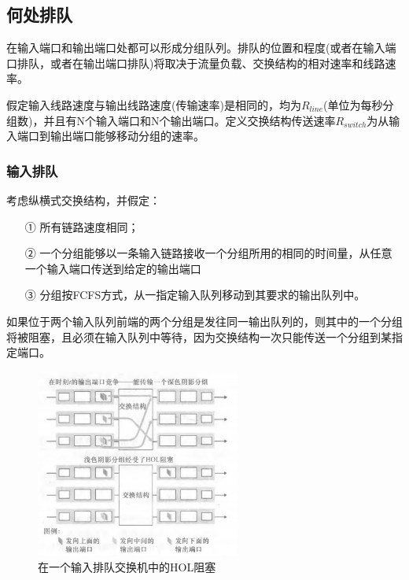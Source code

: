\subsection{何处排队}

    在输入端口和输出端口处都可以形成分组队列。排队的位置和程度(或者在输入端口排队，或者在输岀端口排队)将取决于流量负载、交换结构的相对速率和线路速率。

    假定输入线路速度与输出线路速度(传输速率)是相同的，均为$R_{line}$(单位为每秒分组数)，并且有N个输入端口和N个输出端口。定义交换结构传送速率$R_{switch}$为从输入端口到输出端口能够移动分组的速率。

\subsubsection{输入排队}

    考虑纵横式交换结构，并假定：
    
\begin{itemize}
    \item [①] 所有链路速度相同；
    \item [②] 一个分组能够以一条输入链路接收一个分组所用的相同的时间量，从任意一个输入端口传送到给定的输出端口
    \item [③] 分组按FCFS方式，从一指定输入队列移动到其要求的输出队列中。
\end{itemize}

    如果位于两个输入队列前端的两个分组是发往同一输出队列的，则其中的一个分组将被阻塞，且必须在输入队列中等待，因为交换结构一次只能传送一个分组到某指定端口。

\begin{figure}[!htbp]
    \centering
    \includegraphics[width=0.6\textwidth]{image/chapter04/输入排队交换机中的HOL阻塞.png}
    \caption{在一个输入排队交换机中的HOL阻塞}
\end{figure}

